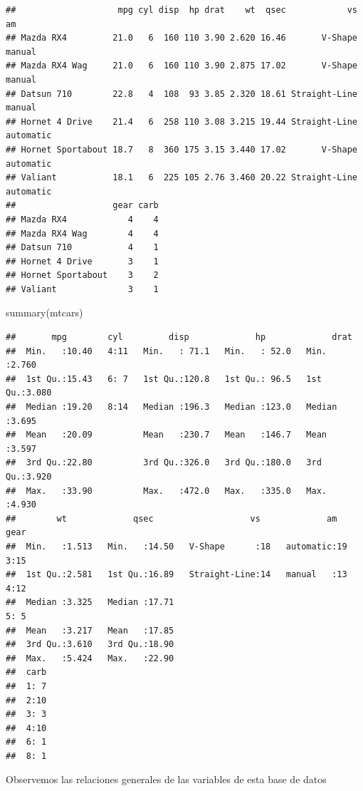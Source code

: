 \documentclass[
  12pt,
]{book}
\newenvironment{Shaded}{\begin{snugshade}}{\end{snugshade}}
\newcommand{\FunctionTok}[1]{\textcolor[rgb]{0.00,0.00,0.00}{#1}}
\newcommand{\NormalTok}[1]{#1}
\begin{document}
\begin{verbatim}
##                    mpg cyl disp  hp drat    wt  qsec            vs        am
## Mazda RX4         21.0   6  160 110 3.90 2.620 16.46       V-Shape    manual
## Mazda RX4 Wag     21.0   6  160 110 3.90 2.875 17.02       V-Shape    manual
## Datsun 710        22.8   4  108  93 3.85 2.320 18.61 Straight-Line    manual
## Hornet 4 Drive    21.4   6  258 110 3.08 3.215 19.44 Straight-Line automatic
## Hornet Sportabout 18.7   8  360 175 3.15 3.440 17.02       V-Shape automatic
## Valiant           18.1   6  225 105 2.76 3.460 20.22 Straight-Line automatic
##                   gear carb
## Mazda RX4            4    4
## Mazda RX4 Wag        4    4
## Datsun 710           4    1
## Hornet 4 Drive       3    1
## Hornet Sportabout    3    2
## Valiant              3    1
\end{verbatim}

\begin{Shaded}
\begin{Highlighting}[]
\FunctionTok{summary}\NormalTok{(mtcars)}
\end{Highlighting}
\end{Shaded}

\begin{verbatim}
##       mpg        cyl         disp             hp             drat      
##  Min.   :10.40   4:11   Min.   : 71.1   Min.   : 52.0   Min.   :2.760  
##  1st Qu.:15.43   6: 7   1st Qu.:120.8   1st Qu.: 96.5   1st Qu.:3.080  
##  Median :19.20   8:14   Median :196.3   Median :123.0   Median :3.695  
##  Mean   :20.09          Mean   :230.7   Mean   :146.7   Mean   :3.597  
##  3rd Qu.:22.80          3rd Qu.:326.0   3rd Qu.:180.0   3rd Qu.:3.920  
##  Max.   :33.90          Max.   :472.0   Max.   :335.0   Max.   :4.930  
##        wt             qsec                   vs             am     gear  
##  Min.   :1.513   Min.   :14.50   V-Shape      :18   automatic:19   3:15  
##  1st Qu.:2.581   1st Qu.:16.89   Straight-Line:14   manual   :13   4:12  
##  Median :3.325   Median :17.71                                     5: 5  
##  Mean   :3.217   Mean   :17.85                                           
##  3rd Qu.:3.610   3rd Qu.:18.90                                           
##  Max.   :5.424   Max.   :22.90                                           
##  carb  
##  1: 7  
##  2:10  
##  3: 3  
##  4:10  
##  6: 1  
##  8: 1
\end{verbatim}

Observemos las relaciones generales de las variables de esta base de
datos
\end{document}
